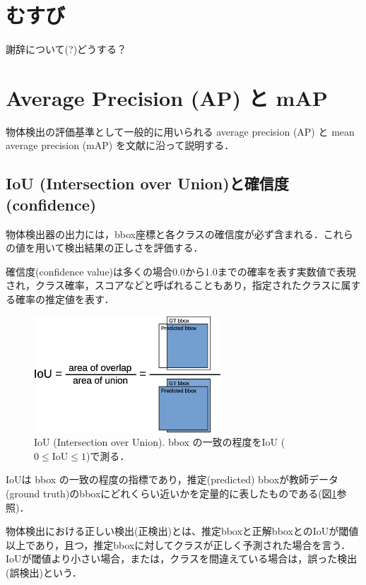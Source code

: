 \documentclass[twocolumn]{jsarticle} %
\begin{document}
\section{むすび}

謝辞について(?)どうする？

\footnotesize

%


\appendix

\section{Average Precision (AP) と mAP}
物体検出の評価基準として一般的に用いられる average precision (AP) と mean average precision (mAP) を文献\cite{PNS20}に沿って説明する．

\subsection{IoU (Intersection over Union)と確信度(confidence)}
物体検出器の出力には，bbox座標と各クラスの確信度が必ず含まれる．これらの値を用いて検出結果の正しさを評価する．

確信度(confidence value)は多くの場合0.0から1.0までの確率を表す実数値で表現され，クラス確率，スコアなどと呼ばれることもあり，指定されたクラスに属する確率の推定値を表す．

\begin{figure}[tb]
    \centering
    \includegraphics[width=7cm,clip]{fig/IoU.eps}
    \caption{ IoU (Intersection over Union). bbox の一致の程度をIoU ($0{\leq}\mbox{IoU}{\leq}1$)で測る．}
    \label{fig:IoU}
\end{figure}
IoUは bbox の一致の程度の指標であり，推定(predicted) bboxが教師データ(ground truth)のbboxにどれくらい近いかを定量的に表したものである(図\ref{fig:IoU}参照)．

物体検出における正しい検出(正検出)とは、推定bboxと正解bboxとのIoUが閾値以上であり，且つ，推定bboxに対してクラスが正しく予測された場合を言う．
IoUが閾値より小さい場合，または，クラスを間違えている場合は，誤った検出(誤検出)という．
\end{document}
